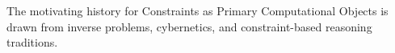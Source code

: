 The motivating history for Constraints as Primary Computational Objects is drawn from inverse problems, cybernetics, and constraint-based reasoning traditions.
